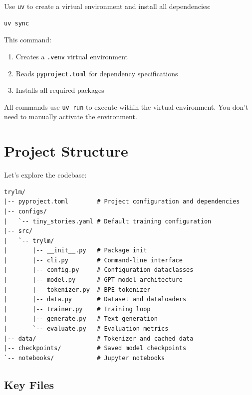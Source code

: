 Use \texttt{uv} to create a virtual environment and install all dependencies:

\begin{lstlisting}[style=shell]
uv sync
\end{lstlisting}

This command:
\begin{enumerate}
    \item Creates a \texttt{.venv} virtual environment
    \item Reads \texttt{pyproject.toml} for dependency specifications
    \item Installs all required packages
\end{enumerate}

\begin{note}
All \TryLM commands use \texttt{uv run} to execute within the virtual environment. You don't need to manually activate the environment.
\end{note}

\section{Project Structure}

Let's explore the \TryLM codebase:

\begin{lstlisting}[style=shell, numbers=none]
trylm/
|-- pyproject.toml        # Project configuration and dependencies
|-- configs/
|   `-- tiny_stories.yaml # Default training configuration
|-- src/
|   `-- trylm/
|       |-- __init__.py   # Package init
|       |-- cli.py        # Command-line interface
|       |-- config.py     # Configuration dataclasses
|       |-- model.py      # GPT model architecture
|       |-- tokenizer.py  # BPE tokenizer
|       |-- data.py       # Dataset and dataloaders
|       |-- trainer.py    # Training loop
|       |-- generate.py   # Text generation
|       `-- evaluate.py   # Evaluation metrics
|-- data/                 # Tokenizer and cached data
|-- checkpoints/          # Saved model checkpoints
`-- notebooks/            # Jupyter notebooks
\end{lstlisting}

\subsection{Key Files}

